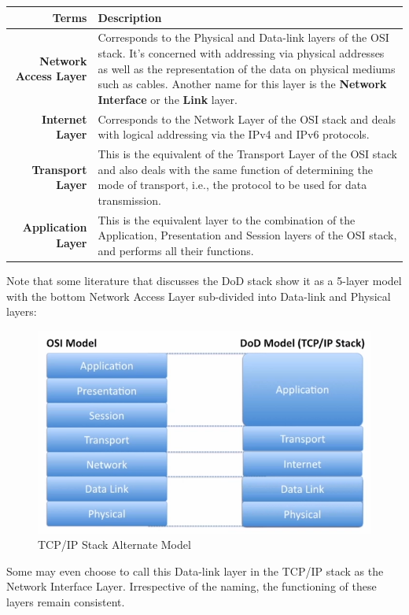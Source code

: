 \noindent
\begin{tabular}{rM{0.69}}
	\toprule
	\textbf{Terms} &\textbf{Description} \\
	\midrule
	\textbf{Network Access Layer}	&Corresponds to the Physical and Data-link layers of the OSI stack. It's concerned with addressing via physical addresses as well as the representation of the data on physical mediums such as cables. Another name for this layer is the \textbf{Network Interface} or the \textbf{Link} layer.\\
	\midrule
	\textbf{Internet Layer}	&Corresponds to the Network Layer of the OSI stack and deals with logical addressing via the IPv4 and IPv6 protocols.\\
	\midrule
	\textbf{Transport Layer}	&This is the equivalent of the Transport Layer of the OSI stack and also deals with the same function of determining the mode of transport, i.e., the protocol to be used for data transmission.\\
	\midrule
	\textbf{Application Layer}	&This is the equivalent layer to the combination of the Application, Presentation and Session layers of the OSI stack, and performs all their functions. \\
	\bottomrule
\end{tabular}

\noindent
Note that some literature that discusses the DoD stack show it as a 5-layer model with the bottom Network Access Layer sub-divided into Data-link and Physical layers:

\begin{figure}[H]
	\centering
	\includegraphics[width=0.7\linewidth]{"Mod1/chapters/1.1.c DoD Alternate Model"}
	\caption{TCP/IP Stack Alternate Model}
	\label{fig:1 TCP/IP Stack Alternate Model}
\end{figure}

\noindent
Some may even choose to call this Data-link layer in the TCP/IP stack as the Network Interface Layer. Irrespective of the naming, the functioning of these layers remain consistent. 

